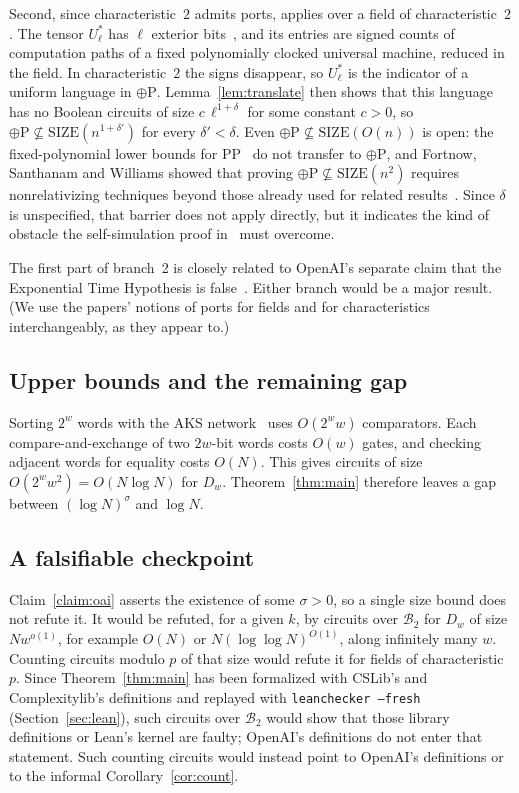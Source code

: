 \documentclass[11pt]{article}
\theoremstyle{definition}
\newcommand{\Dw}{D_w}
\newcommand{\B}{\mathcal{B}_2}
\begin{document}
\begin{enumerate}
Second, since characteristic~$2$ admits ports, \cite[Theorem~12.1]{OAI-HC} applies over a field of characteristic~$2$. The tensor $U_\ell^*$ has $\ell$ exterior bits~\cite[Section~4.3]{OAI-MM}, and its entries are signed counts of computation paths of a fixed polynomially clocked universal machine, reduced in the field. In characteristic~$2$ the signs disappear, so $U_\ell^*$ is the indicator of a uniform language in $\oplus\mathrm{P}$. Lemma~\ref{lem:translate} then shows that this language has no Boolean circuits of size $c\,\ell^{1+\delta}$ for some constant $c>0$, so $\oplus\mathrm{P}\not\subseteq\mathrm{SIZE}(n^{1+\delta'})$ for every $\delta'<\delta$. Even $\oplus\mathrm{P}\not\subseteq\mathrm{SIZE}(O(n))$ is open: the fixed-polynomial lower bounds for $\mathrm{PP}$~\cite{Vin05} do not transfer to $\oplus\mathrm{P}$, and Fortnow, Santhanam and Williams showed that proving $\oplus\mathrm{P}\not\subseteq\mathrm{SIZE}(n^2)$ requires nonrelativizing techniques beyond those already used for related results~\cite{FSW09}. Since $\delta$ is unspecified, that barrier does not apply directly, but it indicates the kind of obstacle the self-simulation proof in~\cite[Sections~13--15]{OAI-HC} must overcome.
\end{enumerate}
The first part of branch~2 is closely related to OpenAI's separate claim that the Exponential Time Hypothesis is false~\cite{OAI-ETH}. Either branch would be a major result. (We use the papers' notions of ports for fields and for characteristics interchangeably, as they appear to.)

\subsection{Upper bounds and the remaining gap}\label{sec:upper}

Sorting $2^w$ words with the AKS network~\cite{AKS83} uses $O(2^w w)$ comparators. Each compare-and-exchange of two $2w$-bit words costs $O(w)$ gates, and checking adjacent words for equality costs $O(N)$. This gives circuits of size $O(2^w w^2) = O(N\log N)$ for $\Dw$. Theorem~\ref{thm:main} therefore leaves a gap between $(\log N)^{\sigma}$ and $\log N$.

\subsection{A falsifiable checkpoint}

Claim~\ref{claim:oai} asserts the existence of some $\sigma>0$, so a single size bound does not refute it. It would be refuted, for a given $k$, by circuits over $\B$ for $\Dw$ of size $N w^{o(1)}$, for example $O(N)$ or $N(\log\log N)^{O(1)}$, along infinitely many $w$. Counting circuits modulo $p$ of that size would refute it for fields of characteristic $p$. Since Theorem~\ref{thm:main} has been formalized with CSLib's and Complexitylib's definitions and replayed with \texttt{leanchecker --fresh} (Section~\ref{sec:lean}), such circuits over $\B$ would show that those library definitions or Lean's kernel are faulty; OpenAI's definitions do not enter that statement. Such counting circuits would instead point to OpenAI's definitions or to the informal Corollary~\ref{cor:count}.
\end{document}
